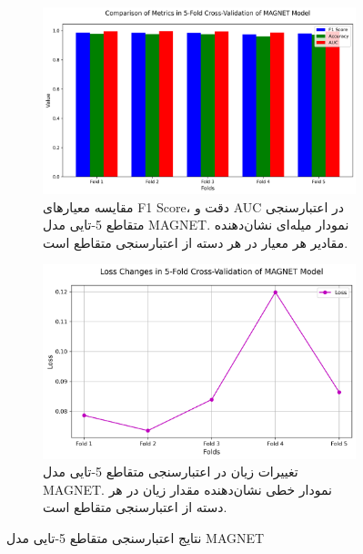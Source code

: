\begin{figure}[h!]
    \centering
    \begin{subfigure}[b]{0.48\textwidth}
        \centering
        \includegraphics[width=\textwidth]{fig_cv_metrics}
        \caption{مقایسه معیارهای F1 Score، دقت و AUC در اعتبارسنجی متقاطع 5-تایی مدل MAGNET. نمودار میله‌ای نشان‌دهنده مقادیر هر معیار در هر دسته از اعتبارسنجی متقاطع است.}
        \label{fig:cv_metrics}
    \end{subfigure}
    \hfill
    \begin{subfigure}[b]{0.48\textwidth}
        \centering
        \includegraphics[width=\textwidth]{fig_cv_loss}
        \caption{تغییرات زیان در اعتبارسنجی متقاطع 5-تایی مدل MAGNET. نمودار خطی نشان‌دهنده مقدار زیان در هر دسته از اعتبارسنجی متقاطع است.}
        \label{fig:cv_loss}
    \end{subfigure}
    \caption{نتایج اعتبارسنجی متقاطع 5-تایی مدل MAGNET}
    \label{fig:cv_results}
\end{figure}

